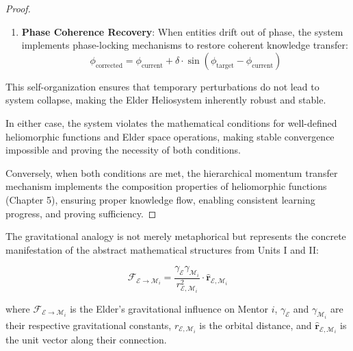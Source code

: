 \begin{proof}
\begin{enumerate}
    \item \textbf{Phase Coherence Recovery}: When entities drift out of phase, the system implements phase-locking mechanisms to restore coherent knowledge transfer:
    \begin{equation}
    \phi_{\text{corrected}} = \phi_{\text{current}} + \delta \cdot \sin(\phi_{\text{target}} - \phi_{\text{current}})
    \end{equation}
\end{enumerate}

This self-organization ensures that temporary perturbations do not lead to system collapse, making the Elder Heliosystem inherently robust and stable.

In either case, the system violates the mathematical conditions for well-defined heliomorphic functions and Elder space operations, making stable convergence impossible and proving the necessity of both conditions.

Conversely, when both conditions are met, the hierarchical momentum transfer mechanism implements the composition properties of heliomorphic functions (Chapter 5), ensuring proper knowledge flow, enabling consistent learning progress, and proving sufficiency.
\end{proof}

The gravitational analogy is not merely metaphorical but represents the concrete manifestation of the abstract mathematical structures from Units I and II:

\begin{equation}
\mathcal{F}_{\mathcal{E} \rightarrow \mathcal{M}_i} = \frac{\gamma_{\mathcal{E}} \gamma_{\mathcal{M}_i}}{r_{\mathcal{E},\mathcal{M}_i}^2} \cdot \mathbf{\hat{r}}_{\mathcal{E},\mathcal{M}_i}
\end{equation}

where $\mathcal{F}_{\mathcal{E} \rightarrow \mathcal{M}_i}$ is the Elder's gravitational influence on Mentor $i$, $\gamma_{\mathcal{E}}$ and $\gamma_{\mathcal{M}_i}$ are their respective gravitational constants, $r_{\mathcal{E},\mathcal{M}_i}$ is the orbital distance, and $\mathbf{\hat{r}}_{\mathcal{E},\mathcal{M}_i}$ is the unit vector along their connection.


